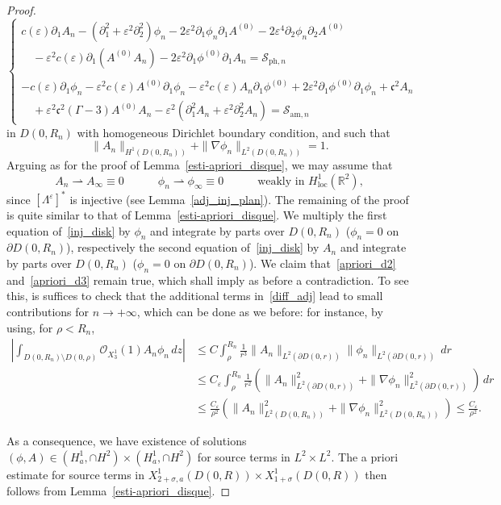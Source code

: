 \documentclass[10pt]{amsart}
\theoremstyle{definition}\newtheorem{defi}[theo]{Definition}\newtheorem{rema}[theo]{Remark}\newtheorem{exam}[theo]{Example}\newtheorem{exem}[theo]{Example}\newtheorem{nota}[theo]{Notation}
\newcommand*\p{\partial}
\newcommand*\R{\mathbb R}
\newcommand{\amm}{\mathrm{am}}
\newcommand{\phl}{\mathrm{ph}}
\newcommand{\locc}{\mathrm{loc}}
\newcommand*\BO{\mathcal{O}}
\newcommand*\BS{\mathcal{S}}
\newcommand*\cs{{\mathfrak c}}
\newcommand*\ii{\infty}
\newcommand*\ls{\leqslant }
\newcommand*\e{\varepsilon}
\newcommand*\s{\sigma}
\begin{document}
\begin{proof}
\begin{equation}\label{inj_disk}
\left\{
\begin{array}{ll}
c(\e) \p_{1} A_n - \left(\p_{1}^2 + \e^2 \p^2_{2}\right) \phi_n - 2 \e^2 \p_{1} \phi_n \p_{1} A^{(0)} - 2 \e^4 \p_{2} \phi_n \p_{2} A^{(0)}
\\
\quad - \e^2 c(\e) \p_1 (A^{(0)} A_n) - 2 \e^2 \p_{1} \phi^{(0)} \p_{1} A_n = \BS_{{\phl},n} \\ \ \\
- c(\e) \p_{1} \phi_n - \e^2 c(\e) A^{(0)} \p_1 \phi_n - \e^2 c(\e) A_n \p_1 \phi^{(0)} + 2 \e^2 \p_{1} \phi^{(0)} \p_{1} \phi_n + \cs^2 A_n
\\
\quad + \e^2 \cs^2 (\Gamma -3) A^{(0)} A_n - \e^2 \left(\p_{1}^2 A_n + \e^2 \p_{2}^2 A_n\right) = \BS_{{\amm},n}
\end{array}\right.
\end{equation}
in $ D(0,R_n) $ with homogeneous Dirichlet boundary condition, and such that
\begin{equation}\label{hyp1_disk_inj}
\| A_n \|_{ H^1 (D(0,R_n))} + \| \nabla \phi_n \|_{ L^2 (D(0,R_n))} = 1.
\end{equation}
Arguing as for the proof of Lemma~\ref{esti-apriori_disque}, we may assume that
\[
A_n \rightharpoonup A_\ii \equiv 0
\quad \quad \quad
\phi_n \rightharpoonup \phi_\ii \equiv 0
\quad \quad \quad
\text{weakly in } H^{1 }_{\locc} (\R^2),
\]
since $ [\Lambda^\e]^* $ is injective (see Lemma~\ref{adj_inj_plan}). The remaining of the proof is quite similar to that of Lemma~\ref{esti-apriori_disque}. We multiply the first equation of~\eqref{inj_disk} by $ \phi_n $ and integrate by parts over $ D(0, R_n) $ ($\phi_n= 0 $ on $ \p D(0,R_n) $), respectively the second equation of~\eqref{inj_disk} by $ A_n $ and integrate by parts over $ D(0, R_n) $ ($\phi_n= 0 $ on $ \p D(0,R_n) $). We claim that~\eqref{apriori_d2} and~\eqref{apriori_d3} remain true, which shall imply as before a contradiction. To see this, is suffices to check that the additional terms in~\eqref{diff_adj} lead to small contributions for $n \to +\ii $, which can be done as we before: for instance, by using, for $\rho < R_n$,
\begin{align*}
\left \lvert \int_{D(0,R_n) \setminus D(0, \rho) } \BO_{X^1_3} (1) A_n \phi_n \, dz \right \rvert & \ls C \int_\rho^{R_n} \frac{1}{r^3} \| A_n \|_{L^2(\p D(0,r))} \| \phi_n \|_{L^2(\p D(0,r))} \, d r
\\ & \ls C_\e \int_\rho^{R_n} \frac{1}{ r^2 } \left(\| A_n \|_{L^2(\p D(0,r))}^2 + \| \nabla \phi_n \|_{L^2(\p D(0,r))}^2\right) \, d r
\\ & \ls
\frac{C_\e}{ \rho^2 } \left(\| A_n \|_{L^2(D(0,R_n))}^2 + \| \nabla \phi_n \|_{L^2(D(0,R_n))}^2\right)
\ls \frac{C_\e}{ \rho^2 }.
\end{align*}

As a consequence, we have existence of solutions $ (\phi,A) \in (H^1_a, \cap H^2) \times (H^1_a, \cap H^2) $ for source terms in $ L^2 \times L^2 $. The a priori estimate for source terms in $ X^{1}_{ 2+\s, a} (D(0,R)) \times X^{ 1}_{1+\s} (D(0,R)) $ then follows from Lemma~\ref{esti-apriori_disque}.
\end{proof}
\end{document}

